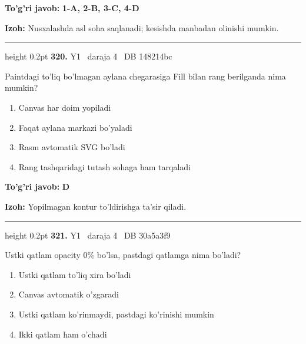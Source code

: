 \documentclass[10pt,a4paper,oneside]{article}
\begin{document}
\begin{tcolorbox}[enhanced,breakable,colback=teal!4,colframe=teal!45!black,boxrule=0.45pt,arc=1.2mm,left=2.8mm,right=2.8mm,top=2mm,bottom=2mm,before skip=2mm,after skip=2mm]
\textbf{\color{teal}To'g'ri javob:} \textbf{1-A, 2-B, 3-C, 4-D}
\par\smallskip
\textbf{Izoh:} Nusxalashda asl soha saqlanadi; kesishda manbadan olinishi mumkin.
\end{tcolorbox}
\vspace{2mm}\hrule height 0.2pt \vspace{4mm}
\hypertarget{q320}{\textbf{\color{ink}320.}}  {\color{muted}\scriptsize Y1 \textbullet\ daraja 4 \textbullet\ DB 148214bc}
\par
Paintdagi to'liq bo'lmagan aylana chegarasiga Fill bilan rang berilganda nima mumkin?
\begin{enumerate}[label=\Alph*),leftmargin=9mm]
\item Canvas har doim yopiladi
\item Faqat aylana markazi bo'yaladi
\item Rasm avtomatik SVG bo'ladi
\item Rang tashqaridagi tutash sohaga ham tarqaladi
\end{enumerate}
\begin{tcolorbox}[enhanced,breakable,colback=teal!4,colframe=teal!45!black,boxrule=0.45pt,arc=1.2mm,left=2.8mm,right=2.8mm,top=2mm,bottom=2mm,before skip=2mm,after skip=2mm]
\textbf{\color{teal}To'g'ri javob:} \textbf{D}
\par\smallskip
\textbf{Izoh:} Yopilmagan kontur to'ldirishga ta'sir qiladi.
\end{tcolorbox}
\vspace{2mm}\hrule height 0.2pt \vspace{4mm}
\hypertarget{q321}{\textbf{\color{ink}321.}}  {\color{muted}\scriptsize Y1 \textbullet\ daraja 4 \textbullet\ DB 30a5a3f9}
\par
Ustki qatlam opacity 0\% bo'lsa, pastdagi qatlamga nima bo'ladi?
\begin{enumerate}[label=\Alph*),leftmargin=9mm]
\item Ustki qatlam to'liq xira bo'ladi
\item Canvas avtomatik o'zgaradi
\item Ustki qatlam ko'rinmaydi, pastdagi ko'rinishi mumkin
\item Ikki qatlam ham o'chadi
\end{enumerate}
\end{document}
